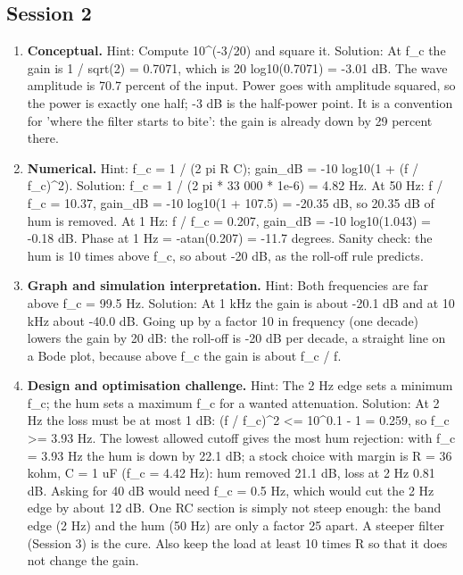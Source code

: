 \documentclass[11pt,a4paper]{article}
\begin{document}
\subsection*{Session 2}
\begin{enumerate}[nosep]
\item \textbf{Conceptual.} Hint: Compute 10\textasciicircum{}(-3/20) and square it. Solution: At f\_c the gain is 1 / sqrt(2) = 0.7071, which is 20 log10(0.7071) = -3.01 dB. The wave amplitude is 70.7 percent of the input. Power goes with amplitude squared, so the power is exactly one half; -3 dB is the half-power point. It is a convention for 'where the filter starts to bite': the gain is already down by 29 percent there.
\item \textbf{Numerical.} Hint: f\_c = 1 / (2 pi R C); gain\_dB = -10 log10(1 + (f / f\_c)\textasciicircum{}2). Solution: f\_c = 1 / (2 pi * 33 000 * 1e-6) = 4.82 Hz. At 50 Hz: f / f\_c = 10.37, gain\_dB = -10 log10(1 + 107.5) = -20.35 dB, so 20.35 dB of hum is removed. At 1 Hz: f / f\_c = 0.207, gain\_dB = -10 log10(1.043) = -0.18 dB. Phase at 1 Hz = -atan(0.207) = -11.7 degrees. Sanity check: the hum is 10 times above f\_c, so about -20 dB, as the roll-off rule predicts.
\item \textbf{Graph and simulation interpretation.} Hint: Both frequencies are far above f\_c = 99.5 Hz. Solution: At 1 kHz the gain is about -20.1 dB and at 10 kHz about -40.0 dB. Going up by a factor 10 in frequency (one decade) lowers the gain by 20 dB: the roll-off is -20 dB per decade, a straight line on a Bode plot, because above f\_c the gain is about f\_c / f.
\item \textbf{Design and optimisation challenge.} Hint: The 2 Hz edge sets a minimum f\_c; the hum sets a maximum f\_c for a wanted attenuation. Solution: At 2 Hz the loss must be at most 1 dB: (f / f\_c)\textasciicircum{}2 \textless{}= 10\textasciicircum{}0.1 - 1 = 0.259, so f\_c \textgreater{}= 3.93 Hz. The lowest allowed cutoff gives the most hum rejection: with f\_c = 3.93 Hz the hum is down by 22.1 dB; a stock choice with margin is R = 36 kohm, C = 1 uF (f\_c = 4.42 Hz): hum removed 21.1 dB, loss at 2 Hz 0.81 dB. Asking for 40 dB would need f\_c = 0.5 Hz, which would cut the 2 Hz edge by about 12 dB. One RC section is simply not steep enough: the band edge (2 Hz) and the hum (50 Hz) are only a factor 25 apart. A steeper filter (Session 3) is the cure. Also keep the load at least 10 times R so that it does not change the gain.
\end{enumerate}
\end{document}
